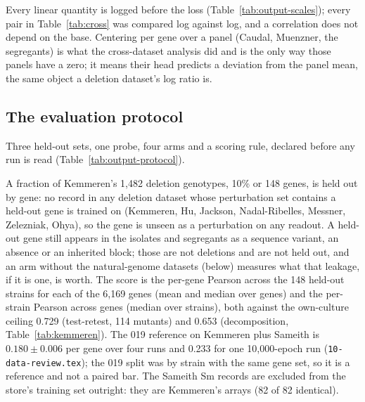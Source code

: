 Every linear quantity is logged before the loss (Table~\ref{tab:output-scales}); every
pair in Table~\ref{tab:cross} was compared log against log, and a correlation does not
depend on the base. Centering per gene over a panel (Caudal, Muenzner, the segregants) is
what the cross-dataset analysis did and is the only way those panels have a zero; it means
their head predicts a deviation from the panel mean, the same object a deletion dataset's
log ratio is.

\subsection{The evaluation protocol}
\label{sec:output-protocol}

Three held-out sets, one probe, four arms and a scoring rule, declared before any run is
read (Table~\ref{tab:output-protocol}).

A fraction of Kemmeren's 1{,}482 deletion genotypes, 10\% or 148 genes, is held out by
gene: no record in any deletion dataset whose perturbation set contains a held-out gene is
trained on (Kemmeren, Hu, Jackson, Nadal-Ribelles, Messner, Zelezniak, Ohya), so the gene
is unseen as a perturbation on any readout. A held-out gene still appears in the isolates
and segregants as a sequence variant, an absence or an inherited block; those are not
deletions and are not held out, and an arm without the natural-genome datasets
(below) measures what that leakage, if it is one, is worth. The score is the per-gene
Pearson across the 148 held-out strains for each of the 6{,}169 genes (mean and median
over genes) and the per-strain Pearson across genes (median over strains), both against
the own-culture ceiling 0.729 (test-retest, 114 mutants) and 0.653 (decomposition,
Table~\ref{tab:kemmeren}). The 019 reference on Kemmeren plus Sameith is $0.180 \pm
0.006$ per gene over four runs and 0.233 for one 10{,}000-epoch run
(\texttt{10-data-review.tex}); the 019 split was by strain with the same gene set, so it
is a reference and not a paired bar. The Sameith Sm records are excluded from the store's
training set outright: they are Kemmeren's arrays (82 of 82 identical).

